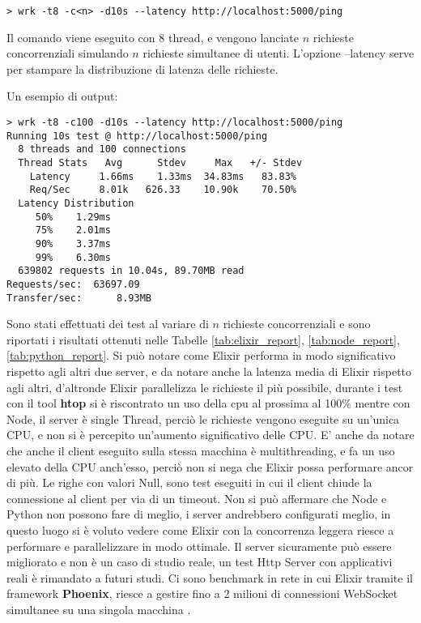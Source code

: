 \begin{lstlisting}[language=none]
> wrk -t8 -c<n> -d10s --latency http://localhost:5000/ping
\end{lstlisting}

Il comando viene eseguito con 8 thread, e vengono lanciate
$n$ richieste concorrenziali simulando $n$ richieste
simultanee di utenti. L'opzione --latency serve per stampare la
distribuzione di latenza delle richieste.

\newpage
Un esempio di output:

\begin{lstlisting}[language=none]
> wrk -t8 -c100 -d10s --latency http://localhost:5000/ping
Running 10s test @ http://localhost:5000/ping
  8 threads and 100 connections
  Thread Stats   Avg      Stdev     Max   +/- Stdev
    Latency     1.66ms    1.33ms  34.83ms   83.83%
    Req/Sec     8.01k   626.33    10.90k    70.50%
  Latency Distribution
     50%    1.29ms
     75%    2.01ms
     90%    3.37ms
     99%    6.30ms
  639802 requests in 10.04s, 89.70MB read
Requests/sec:  63697.09
Transfer/sec:      8.93MB
\end{lstlisting}

Sono stati effettuati dei test al variare di $n$
richieste concorrenziali e sono riportati i risultati
ottenuti nelle Tabelle \ref{tab:elixir_report},
\ref{tab:node_report}, \ref{tab:python_report}.
Si può notare come Elixir performa in modo significativo
rispetto agli altri due server, e da notare anche la latenza media
di Elixir rispetto agli altri, d'altronde Elixir parallelizza
le richieste il più possibile, durante i test con il tool
\textbf{htop} si è riscontrato un uso della cpu al prossima al 100\%
mentre con Node, il server è single Thread, perciò le richieste
vengono eseguite su un'unica CPU, e non si è percepito un'aumento
significativo delle CPU. E' anche da notare che anche il client
eseguito sulla stessa macchina è multithreading, e fa un uso
elevato della CPU anch'esso, perciò non si nega che Elixir
possa performare ancor di più.
Le righe con valori Null, sono test eseguiti in
cui il client chiude la connessione al client per via di un timeout.
Non si può affermare che Node e Python non possono
fare di meglio, i server andrebbero configurati meglio,
in questo luogo si è voluto vedere come Elixir con la
concorrenza leggera riesce a performare e parallelizzare
in modo ottimale.
Il server sicuramente può essere migliorato
e non è un caso di studio reale, un test Http Server
con applicativi reali è rimandato a futuri studi.
Ci sono benchmark in rete in cui Elixir tramite il
framework \textbf{Phoenix},
riesce a gestire fino a 2 milioni di connessioni
WebSocket simultanee
su una singola macchina \cite{TheRoadt94:online}.


